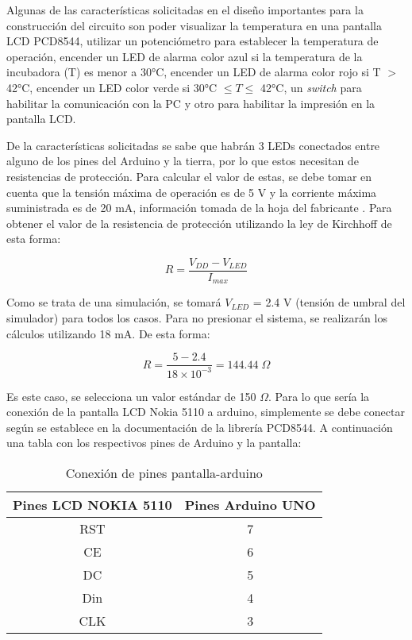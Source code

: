 Algunas de las características solicitadas en el diseño importantes para la construcción del circuito son poder visualizar la temperatura en una pantalla LCD PCD8544, utilizar un potenciómetro para establecer la temperatura de operación, encender un LED de alarma color azul si la temperatura de la incubadora (T) es menor a 30°C, encender un LED de alarma color rojo si T $>$ 42°C, encender un LED color verde si 30°C $\leq T \leq$ 42°C, un \textit{switch} para habilitar la comunicación con la PC y otro para habilitar la impresión en la pantalla LCD.



De la características solicitadas se sabe que habrán 3 LEDs conectados entre alguno de los pines del Arduino y la tierra, por lo que estos necesitan de resistencias de protección. Para calcular el valor de estas, se debe tomar en cuenta que la tensión máxima de operación es de 5 V y la corriente máxima suministrada es de 20 mA, información tomada de la hoja del fabricante \cite{AT}. Para obtener el valor de la resistencia de protección utilizando la ley de Kirchhoff de esta forma:

\begin{equation}
    R = \frac{V_{DD} - V_{LED}}{I_{max}} 
\end{equation}

Como se trata de una simulación, se tomará $V_{LED}$ = 2.4 V (tensión de umbral del simulador) para todos los casos. Para no presionar el sistema, se realizarán los cálculos utilizando 18 mA. De esta forma: 

\begin{equation}
    R = \frac{5 - 2.4}{18 \times 10^{-3}} = 144.44 \; \Omega
\end{equation}

\noindent Es este caso, se selecciona un valor estándar de 150 $\Omega$. 
Para lo que sería la conexión de la pantalla LCD Nokia 5110 a arduino, simplemente se debe conectar según se establece en la documentación de la librería PCD8544.\cite{Rodrigues} A continuación una tabla con los respectivos pines de Arduino y la pantalla:

\begin{table}[H]
\caption{Conexión de pines pantalla-arduino}
\begin{center}
\begin{tabular}{c|c}
\hline
\textbf{Pines LCD NOKIA 5110}&\textbf{Pines Arduino UNO}\\
\hline
RST  & 7\\
CE & 6 \\
DC & 5 \\
Din & 4\\
CLK  & 3 \\
\hline
\end{tabular} \label{table:pantalla}
\end{center}
\end{table}

